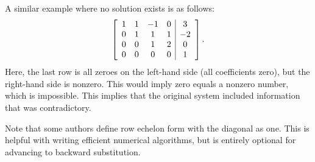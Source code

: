 A similar example where no solution exists is as follows:
\begin{align}
  \left[ \begin{array}{c c c c | c}   1		  & 1		&  -1		& 0			    & 3		\\
  								      0 	  & 1		&  1	 	& 1				& -2	\\
									  0		  & 0 		&  1  		& 2			 	&  0	\\ 
								      0 	  & 0 		&  0		& 0				&  1 	\\ \end{array} \right] . \nonumber
\end{align}
Here, the last row is all zeroes on the left-hand side (all coefficients zero), but the right-hand side is nonzero. This would imply zero equals a nonzero number, which is impossible. This implies that the original system included information that was contradictory.

Note that some authors define row echelon form with the diagonal as one. This is helpful with writing efficient numerical algorithms, but is entirely optional for advancing to backward substitution. 

